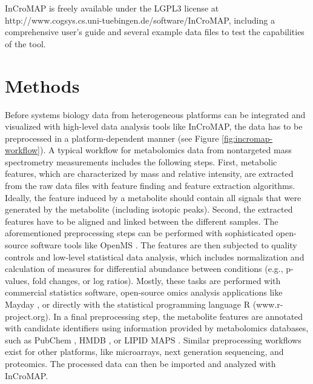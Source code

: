 \documentclass[final,5p,times,twocolumn]{elsarticle}
\begin{document}
InCroMAP is freely available under the LGPL3 license at http://www.cogsys.cs.uni-tuebingen.de/software/InCroMAP, including a comprehensive user’s guide and several example data files to test the capabilities of the tool.

\section{Methods}
Before systems biology data from heterogeneous platforms can be integrated and visualized with high-level data analysis tools like InCroMAP, the data has to be preprocessed in a platform-dependent manner (see Figure \ref{fig:incromap-workflow}). A typical workflow for metabolomics data from nontargeted mass spectrometry measurements includes the following steps. First, metabolic features, which are characterized by mass and relative intensity, are extracted from the raw data files with feature finding and feature extraction algorithms. Ideally, the feature induced by a metabolite should contain all signals that were generated by the metabolite (including isotopic peaks). Second, the extracted features have to be aligned and linked between the different samples. The aforementioned preprocessing steps can be performed with sophisticated open-source software tools like OpenMS \cite{Sturm2008}. The  features are then subjected to quality controls and low-level statistical data analysis, which includes normalization and calculation of measures for differential abundance between conditions (e.g., p-values, fold changes, or log ratios). Mostly, these tasks are performed with commercial statistics software, open-source omics analysis applications like Mayday \cite{Battke2010}, or directly with the statistical programming language R (www.r-project.org). In a final preprocessing step, the metabolite features are annotated with candidate identifiers using information provided by metabolomics databases, such as PubChem \cite{Wang2009}, HMDB \cite{Wishart2009}, or LIPID MAPS \cite{Sud2007}. Similar preprocessing workflows exist for other platforms, like microarrays, next generation sequencing, and proteomics. The processed data can then be imported and analyzed with InCroMAP.
\end{document}
